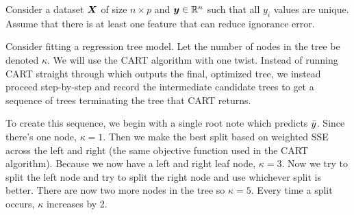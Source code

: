 \documentclass[12pt]{article}
\begin{document}
\pagebreak

\problem Consider a dataset $\boldsymbol{X}$ of size $n \times p$ and $\boldsymbol{y} \in \mathbb{R}^n$ such that all $y_i$ values are unique. Assume that there is at least one feature that can reduce ignorance error. 

Consider fitting a regression tree model. Let the number of nodes in the tree be denoted $\kappa$. We will use the CART algorithm with one twist. Instead of running CART straight through which outputs the final, optimized tree, we instead proceed step-by-step and record the intermediate candidate trees to get a sequence of trees terminating the tree that CART returns.

To create this sequence, we begin with a single root note which predicts $\bar{y}$. Since there's one node, $\kappa = 1$. Then we make the best split based on weighted SSE across the left and right (the same objective function used in the CART algorithm). Because we now have a left and right leaf node, $\kappa = 3$. Now we try to split the left node and try to split the right node and use whichever split is better. There are now two more nodes in the tree so $\kappa = 5$. Every time a split occurs, $\kappa$ increases by 2. 
\end{document}
